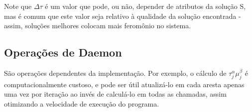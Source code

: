 Note que $\Delta\tau$ é um valor que pode, ou não, depender de atributos da solução S, mas é comum que este valor seja relativo à qualidade da solução encontrada - assim, soluções melhores colocam mais feromônio no sistema.

\subsection{Operações de Daemon}
São operações dependentes da implementação. Por exemplo, o cálculo de $\tau_j^\alpha \mu_j^\beta$ é computacionalmente custoso, e pode ser útil atualizá-lo em cada aresta apenas uma vez por iteração ao invés de calculá-lo em todas as chamadas, assim otimizando a velocidade de execução do programa.


